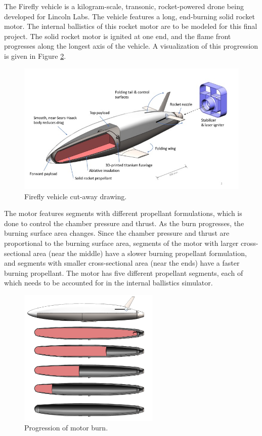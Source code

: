 \documentclass[12pt, letterpaper]{article}
\begin{document}
The Firefly vehicle is a kilogram-scale, transonic, rocket-powered drone being developed for Lincoln Labs. The vehicle features a long, end-burning solid rocket motor. The internal ballistics of this rocket motor are to be modeled for this final project. The solid rocket motor is ignited at one end, and the flame front progresses along the longest axis of the vehicle. A visualization of this progression is given in Figure \ref{fig:burn_progress}. 

\begin{figure}
    \centering
    \includegraphics[width=1\textwidth]{vehicle}
    \caption{\label{fig:vehicle} Firefly vehicle cut-away drawing.}
\end{figure}

The motor features segments with different propellant formulations, which is done to control the chamber pressure and thrust. As the burn progresses, the burning surface area changes. Since the chamber pressure and thrust are proportional to the burning surface area, segments of the motor with larger cross-sectional area (near the middle) have a slower burning propellant formulation, and segments with smaller cross-sectional area (near the ends) have a faster burning propellant. The motor has five different propellant segments, each of which needs to be accounted for in the internal ballistics simulator. 

\begin{figure}
    \centering
    \includegraphics[width=0.6\textwidth]{burn_progress}
    \caption{\label{fig:burn_progress} Progression of motor burn.}
\end{figure}
\end{document}
